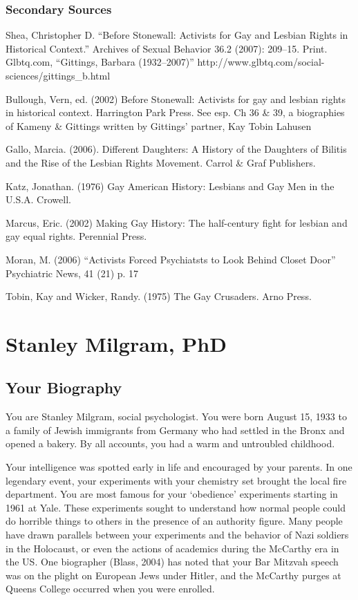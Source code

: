 \begin{refsection}
\subsection{Secondary Sources}
\label{secondarysources}

Shea, Christopher D. ``Before Stonewall: Activists for Gay and Lesbian Rights in Historical Context.'' Archives of Sexual Behavior 36.2 (2007): 209--15. Print.
Glbtq.com, ``Gittings, Barbara (1932--2007)'' http:\slash \slash www.glbtq.com\slash social-sciences\slash gittings\_b.html

Bullough, Vern, ed. (2002) Before Stonewall: Activists for gay and lesbian rights in historical context. Harrington Park Press. See esp. Ch 36 \& 39, a biographies of Kameny \& Gittings written by Gittings' partner, Kay Tobin Lahusen

Gallo, Marcia. (2006). Different Daughters: A History of the Daughters of Bilitis and the Rise of the Lesbian Rights Movement. Carrol \& Graf Publishers.

Katz, Jonathan. (1976) Gay American History: Lesbians and Gay Men in the U.S.A. Crowell.

Marcus, Eric. (2002) Making Gay History: The half-century fight for lesbian and gay equal rights. Perennial Press.

Moran, M. (2006) ``Activists Forced Psychiatsts to Look Behind Closet Door'' Psychiatric News, 41 (21) p. 17

Tobin, Kay and Wicker, Randy. (1975) The Gay Crusaders. Arno Press.

\chapter{Stanley Milgram, PhD}
\label{stanleymilgramphd}

\section{Your Biography}
\label{yourbiography}

You are Stanley Milgram, social psychologist. You were born August 15, 1933 to a family of Jewish immigrants from Germany who had settled in the Bronx and opened a bakery. By all accounts, you had a warm and untroubled childhood.

Your intelligence was spotted early in life and encouraged by your parents. In one legendary event, your experiments with your chemistry set brought the local fire department. You are most famous for your `obedience' experiments starting in 1961 at Yale. These experiments sought to understand how normal people could do horrible things to others in the presence of an authority figure. Many people have drawn parallels between your experiments and the behavior of Nazi soldiers in the Holocaust, or even the actions of academics during the McCarthy era in the US. One biographer (Blass, 2004) has noted that your Bar Mitzvah speech was on the plight on European Jews under Hitler, and the McCarthy purges at Queens College occurred when you were enrolled.


\end{refsection}
